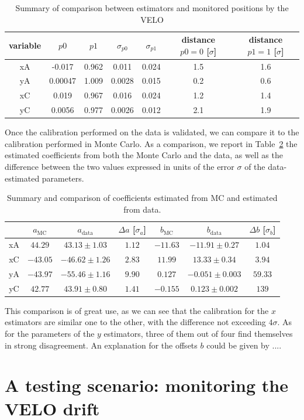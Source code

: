 \begin{table}
    \centering
    \begin{tabular}{c|c|c|c|c|c|c}
    variable  & $p0$ & $p1$ & $\sigma_{p0}$ & $\sigma_{p1}$ & distance $p0=0$ [$\sigma$] & distance $p1=1$ [$\sigma$]\\
    \hline
       xA  & -0.017 & 0.962 & 0.011 & 0.024 & 1.5 & 1.6\\
       yA  & 0.00047 & 1.009 & 0.0028 & 0.015 & 0.2 & 0.6 \\
       xC & 0.019 & 0.967 & 0.016 & 0.024 & 1.2 & 1.4\\
       yC & 0.0056 & 0.977 & 0.0026 & 0.012 & 2.1 & 1.9
    \end{tabular}
    \caption{Summary of comparison between estimators and monitored positions by the VELO}
    \label{tab:summary_velo}
\end{table}

Once the calibration performed on the data is validated, we can compare it to the calibration performed in Monte Carlo. As a comparison, we report in Table~\ref{tab:comparison_coeff} the estimated coefficients from both the Monte Carlo and the data, as well as the difference  between the two values expressed in units of the error $\sigma$ of the data-estimated parameters.

\begin{table}
\centering
\begin{tabular}{
c |
c |
c |
c |
c |
c |
c }
 & $a_{\text{MC}}$ & $a_{\text{data}}$ &  $\Delta a$ [$\sigma_a$] & $b_{\text{MC}}$ &  $b_{\text{data}}$ &  $\Delta b$ [$\sigma_b$] \\ \hline
    { xA} &
  { $44.29$} &
  { $43.13\pm1.03$} &
  $1.12$ &%
  { $-11.63$} &
  { $-11.91\pm0.27$} &
  $1.04$\\%
    { xC} &
  { $-43.05$} &
  { $-46.62\pm1.26$} &
  $2.83$&%
  { $11.99 $} &
  { $13.33\pm0.34$} &
  $3.94$\\%
    { yA} &
  { $-43.97$} &
  { $-55.46\pm 1.16$} &
  $9.90$ &%
  { $0.127 $} &
  { $-0.051\pm0.003$} &
  $59.33$\\%
    { yC} &
  { $42.77 $} &
  { $43.91\pm0.80 $} &
  $1.41$&%
  { $-0.155$} &
  { $0.123\pm0.002 $} &
  $139$%
\end{tabular}
\caption{Summary and comparison of coefficients estimated from MC and estimated from data. }\label{tab:comparison_coeff}
\end{table}
This comparison is of great use, as we can see that the calibration for the $x$ estimators are similar one to the other, with the difference not exceeding $4\sigma$. As for the parameters of the $y$ estimators, three of them out of four find themselves in strong disagreement. An explanation for the offsets $b$ could be given by .... 


\section{A testing scenario: monitoring the VELO drift}

